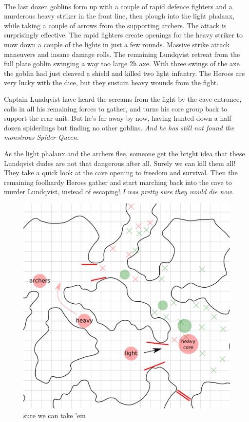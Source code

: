 \

The last dozen goblins form up with a couple of rapid defence fighters and a murderous heavy striker in the front line, then plough into the light phalanx, while taking a couple of arrows from the supporting archers.
The attack is surprisingly effective. The rapid fighters create openings for the heavy striker to mow down a couple of the lights in just a few rounds. Massive strike attack maneuvers and insane damage rolls. The remaining Lundqvist retreat from the full plate goblin swinging a way too large 2h axe. With three swings of the axe the goblin had just cleaved a shield and killed two light infantry. The Heroes are very lucky with the dice, but they sustain heavy wounds from the fight.

Captain Lundqvist have heard the screams from the fight by the cave entrance, calls in all his remaining forces to gather, and turns his core group back to support the rear unit. But he's far away by now, having hunted down a half dozen spiderlings but finding no other goblins. \textit{And he has still not found the monstrous Spider Queen.}

As the light phalanx and the archers flee, someone get the bright idea that these Lundqvist dudes are not that dangerous after all. Surely we can kill them all! They take a quick look at the cave opening to freedom and survival. Then the remaining foolhardy Heroes gather and start marching back into the cave to murder Lundqvist, instead of escaping! \textit{I was pretty sure they would die now.}


\begin{figure}    %
\centering
\includegraphics[width=0.9\linewidth]{./fig/hool2lundqvistresult5-zoom.png}
\caption*{sure we can take 'em}
\end{figure}


